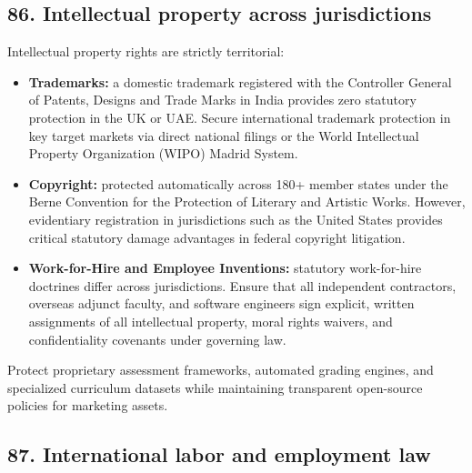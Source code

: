 \subsection{86. Intellectual property across jurisdictions}

Intellectual property rights are strictly territorial:
\begin{itemize}
    \item \textbf{Trademarks:} a domestic trademark registered with the Controller General of Patents, Designs and Trade Marks in India provides zero statutory protection in the UK or UAE. Secure international trademark protection in key target markets via direct national filings or the World Intellectual Property Organization (WIPO) Madrid System.
    \item \textbf{Copyright:} protected automatically across 180+ member states under the Berne Convention for the Protection of Literary and Artistic Works. However, evidentiary registration in jurisdictions such as the United States provides critical statutory damage advantages in federal copyright litigation.
    \item \textbf{Work-for-Hire and Employee Inventions:} statutory work-for-hire doctrines differ across jurisdictions. Ensure that all independent contractors, overseas adjunct faculty, and software engineers sign explicit, written assignments of all intellectual property, moral rights waivers, and confidentiality covenants under governing law.
\end{itemize}
Protect proprietary assessment frameworks, automated grading engines, and specialized curriculum datasets while maintaining transparent open-source policies for marketing assets.

\subsection{87. International labor and employment law}

